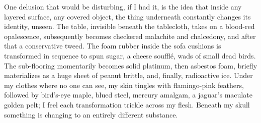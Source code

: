 
One delusion that would be disturbing, if I had it, is the idea that
inside any layered surface, any covered object, the thing underneath
constantly changes its identity, unseen. The table, invisible beneath
the tablecloth, takes on a blood-red opalescence, subsequently becomes
checkered malachite and chalcedony, and after that a conservative tweed.
The foam rubber inside the sofa cushions is transformed in sequence to
spun sugar, a cheese soufflé, wads of small dead birds. The sub-flooring
momentarily becomes solid platinum, then asbestos foam, briefly
materializes as a huge sheet of peanut brittle, and, finally,
radioactive ice. Under my clothes where no one can see, my skin tingles
with flamingo-pink feathers, followed by bird's-eye maple, blued steel,
mercury amalgam, a jaguar's maculate golden pelt; I feel each
transformation trickle across my flesh. Beneath my skull something is
changing to an entirely different substance.

